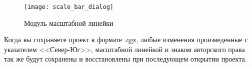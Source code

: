 \begin{figure}[ht]
   \centering
   \texttt{[image: scale\_bar\_dialog]}
   \caption{Модуль масштабной линейки \wincaption}\label{fig:scale_bar}
\end{figure}

\begin{Tip}\caption{\textsc{Сохранение в проекте настроек модулей}}
Когда вы сохраняете проект в формате .qgs, любые изменения произведенные
с указателем <<Север-Юг>>, масштабной линейкой и знаком авторского права
так же будут сохранены и восстановлены при последующем открытии проекта.
\end{Tip}

\FloatBarrier
